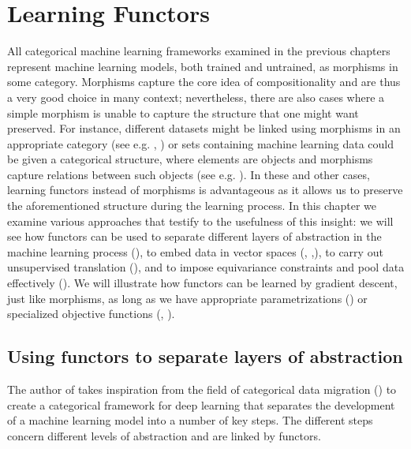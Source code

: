 \documentclass[11pt,a4paper,openright,twoside]{report}
\theoremstyle{plain}
\theoremstyle{definition}
\begin{document}
\chapter{Learning Functors}


\lhead[\fancyplain{}{\bfseries\thepage}]{\fancyplain{}{\bfseries\rightmark}}



All categorical machine learning frameworks examined in the previous chapters represent machine learning models, both trained and untrained, as morphisms in some category. Morphisms capture the core idea of compositionality and are thus a very good choice in many context; nevertheless, there are also cases where a simple morphism is unable to capture the structure that one might want preserved. For instance, different datasets might be linked using morphisms in an appropriate category (see e.g. \cite{spivak2012functorial}, \cite{gavranovic2019compositional}) or sets containing machine learning data could be given a categorical structure, where elements are objects and morphisms capture relations between such objects (see e.g. \cite{lambek1999type}). In these and other cases, learning functors instead of morphisms is advantageous as it allows us to preserve the aforementioned structure during the learning process. In this chapter we examine various approaches that testify to the usefulness of this insight: we will see how functors can be used to separate different layers of abstraction in the machine learning process (\cite{gavranovic2019compositional}), to embed data in vector spaces (\cite{sheshmani2021categorical}, \cite{coecke2010mathematical},\cite{lewis2019compositionality}), to carry out unsupervised translation (\cite{sheshmani2021categorical}), and to impose equivariance constraints and pool data effectively (\cite{chytas2024poolingimagedatasetsmultiple}).
We will illustrate how functors can be learned by gradient descent, just like morphisms, as long as we have appropriate parametrizations (\cite{gavranovic2019compositional}) or specialized objective functions (\cite{sheshmani2021categorical}, \cite{chytas2024poolingimagedatasetsmultiple}). 


\section{Using functors to separate layers of abstraction}

The author of \cite{gavranovic2019compositional} takes inspiration from the field of categorical data migration (\cite{spivak2012functorial}) to create a categorical framework for deep learning that separates the development of a machine learning model into a number of key steps. The different steps concern different levels of abstraction and are linked by functors.
\end{document}
